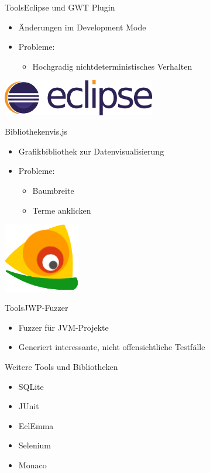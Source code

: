 \documentclass[10pt]{beamer}
\begin{document}
\begin{frame}{Tools}{Eclipse und GWT Plugin}
	\begin{itemize}
		\item Änderungen im Development Mode  
		\item Probleme:
		\begin{itemize}
			\item Hochgradig nichtdeterministisches Verhalten
		\end{itemize}
	\end{itemize}
	\vspace{4cm}
    \hfill\includegraphics[width = 0.5\textwidth]{img/eclipse}
\end{frame}


\begin{frame}{Bibliotheken}{vis.js}
	\begin{itemize}
		\item Grafikbibliothek zur Datenvisualisierung
		\item Probleme: 
			\begin{itemize}
				\item{Baumbreite}
				\item{Terme anklicken}
			\end{itemize}
	\end{itemize}
	\vspace{2.8cm}
    \hfill\includegraphics[width = 0.25\textwidth]{img/vis-cropped}
\end{frame}

\begin{frame}{Tools}{JWP-Fuzzer}
	\begin{itemize}
		\item Fuzzer für JVM-Projekte
		\item Generiert interessante, nicht offensichtliche Testfälle
	\end{itemize}
\end{frame}


\begin{frame}{Weitere Tools und Bibliotheken}{}
	\begin{itemize}
		\item SQLite
		\item JUnit
		\item EclEmma
		\item Selenium
		\item Monaco
	\end{itemize}
\end{frame}
\end{document}
